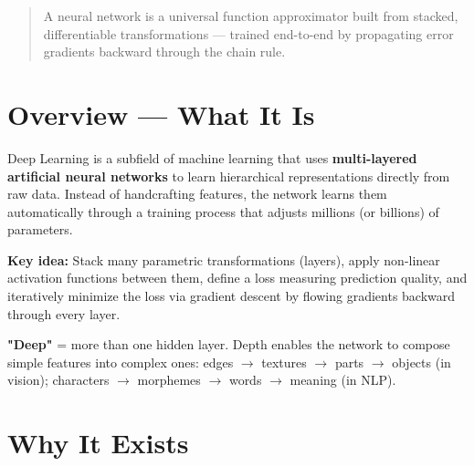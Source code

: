 \documentclass[11pt]{article}
\begin{document}
\makecoverpage

\thispagestyle{empty}
{\hypersetup{hidelinks}\tableofcontents}
\clearpage

\begin{quote}
A neural network is a universal function approximator built from stacked, differentiable transformations --- trained end-to-end by propagating error gradients backward through the chain rule.
\end{quote}

\section{Overview --- What It Is}\label{overview--what-it-is}

Deep Learning is a subfield of machine learning that uses \textbf{multi-layered artificial neural networks} to learn hierarchical representations directly from raw data. Instead of handcrafting features, the network learns them automatically through a training process that adjusts millions (or billions) of parameters.

\textbf{Key idea:} Stack many parametric transformations (layers), apply non-linear activation functions between them, define a loss measuring prediction quality, and iteratively minimize the loss via gradient descent by flowing gradients backward through every layer.

\textbf{"Deep"} = more than one hidden layer. Depth enables the network to compose simple features into complex ones: edges \(\rightarrow\) textures \(\rightarrow\) parts \(\rightarrow\) objects (in vision); characters \(\rightarrow\) morphemes \(\rightarrow\) words \(\rightarrow\) meaning (in NLP).

\section{Why It Exists}\label{why-it-exists}
\end{document}

